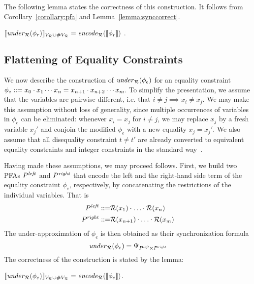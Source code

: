 \documentclass[sigplan,review,anonymous]{acmart}\settopmatter{printfolios=true,printccs=false,printacmref=false}
\begin{document}
The following lemma states the correctness of this construction. 
It follows from Corollary~\ref{corollary:pfa} and Lemma~\ref{lemma:synccorrect}. 
\begin{lemma}\label{lemma:memcorrect}  $[\![\mathit{under}_{\mathcal{R}}(\phi_r)]\!]_{V_{\mathcal{R}} \cup \#V_{\mathcal{R}}} = \mathit{encode}_{\mathcal{R}} ([\![\phi_r]\!])$ . 
\end{lemma}

\subsection{Flattening of Equality Constraints} \label{section:eq}

We now describe the construction of $\mathit{under}_{\mathcal{R}}(\phi_e)$ for an equality constraint $\phi_e::= x_0\cdot x_1 \cdots x_n = x_{n+1}\cdot x_{n+2} \cdots x_m$. 
%
To simplify the presentation, we assume that the variables are pairwise different, i.e. that $i\neq j \implies x_i \neq x_j$. We may make this assumption without loss of generality, since multiple occurrences of variables in $\phi_e$ can be eliminated: whenever $x_i = x_j$ for $i \neq j$, we may replace $x_j$ by a fresh variable $x_j'$ and conjoin the modified $\phi_e$ with a new equality $x_j = x_j'$. 
%
We also assume that all disequality constraint $t \neq t'$ are already converted to equivalent equality constraints and integer constraints in the standard way~\cite{abdulla2015norn}.

Having made these assumptions, we may proceed follows. First, we build two PFAs $P^{\mathit{left}}$ and $P^{\mathit{right}}$ that encode the left and the right-hand side term of the equality constraint $\phi_e$, respectively, by concatenating the restrictions of the individual variables. That is
\begin{eqnarray*}
P^{\mathit{left}} ::=& \mathcal{R}(x_1)\cdot\ldots \cdot \mathcal{R}(x_n)\\
P^{\mathit{right}} ::=& \mathcal{R}(x_{n+1})\cdot\ldots \cdot \mathcal{R}(x_m)
\end{eqnarray*}
The under-approximation of $\phi_e$ is then obtained as their synchronization formula
$$
\mathit{under}_{\mathcal{R}}(\phi_e) = \Psi_{P^{\mathit{left}} \times P^{\mathit{right}}}
$$
The correctness of the construction is stated by the lemma:
\begin{lemma}\label{lemma:eqcorrect}
$[\![\mathit{under}_{\mathcal{R}}(\phi_e)]\!]_{V_{\mathcal{R}}  \cup \#V_{\mathcal{R}}} = \mathit{encode}_{\mathcal{R}} ([\![\phi_e]\!])$.
\end{lemma}
\end{document}
